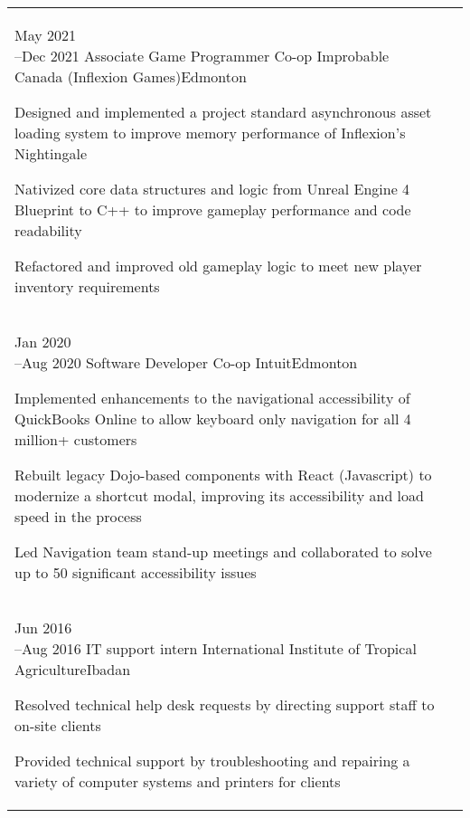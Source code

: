 \documentclass[a4paper]{modernsimplecv}
\begin{document}
\begin{paracol}{2}
\begin{minipage}[t]{\leftcolwidth}
        \begin{tabular}{@{\raggedright}p{} |>{\raggedright\arraybackslash}p{}}
            \cvevent{May 2021\newline --Dec 2021}
                {Associate Game Programmer Co-op}
                {Improbable Canada (Inflexion Games)}{Edmonton}
                {\begin{tabitemize}
                    \item Designed and implemented a project standard asynchronous asset loading system to improve memory performance of Inflexion's Nightingale
                    \item Nativized core data structures and logic from Unreal Engine 4 Blueprint to C++ to improve gameplay performance and code readability
                    \item Refactored and improved old gameplay logic to meet new player inventory requirements
                \end{tabitemize}   
                }\\
            \cvevent{Jan 2020\newline --Aug 2020}
                {Software Developer Co-op}
                {Intuit}{Edmonton}
                {\begin{tabitemize}
                    \item Implemented enhancements to the navigational accessibility of QuickBooks Online to allow keyboard only navigation for all 4 million+ customers
                    \item Rebuilt legacy Dojo-based components with React (Javascript) to modernize a shortcut modal, improving its accessibility and load speed in the process
                    \item Led Navigation team stand-up meetings and collaborated to solve up to 50 significant accessibility issues
                \end{tabitemize}   
                }\\ 
            \cvevent{Jun 2016\newline --Aug 2016}
                {IT support intern}
                {International Institute of Tropical Agriculture}{Ibadan}
                {\begin{tabitemize}
                    \item Resolved technical help desk requests by directing support staff to on-site clients
                    \item Provided technical support by troubleshooting and repairing a variety of computer systems and printers for clients

\end{tabitemize}}
\end{tabular}
\end{minipage}
\end{paracol}
\end{document}
